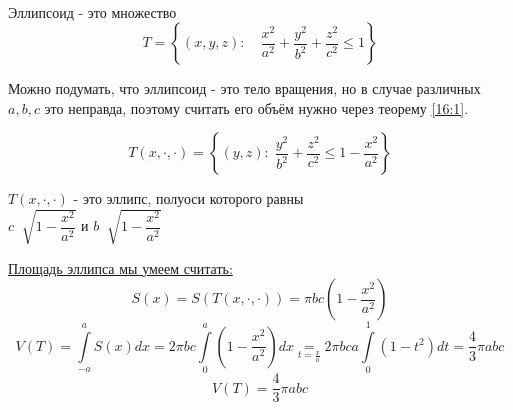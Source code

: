 \documentclass[../main.tex]{subfiles}
\begin{document}
\begin{example}
    
    ~


    Эллипсоид - это множество 
    \[ T=\left\{ \left( x,y,z\right):\quad \dfrac{ x^2}{ a^2}+ \dfrac{ y^2}{ b^2}+ \dfrac{ z^2}{ c^2} \leq 1\right\}\]

    Можно подумать, что эллипсоид - это тело вращения, но в случае различных
    \( a,b,c\) это неправда, поэтому считать его объём нужно через теорему \ref{16:1}. 

    \[ T\left( x,\cdot,\cdot\right)=\left\{ \left( y,z\right):\; \dfrac{ y^2}{ b^2}+ \dfrac{ z^2}{ c^2} \leq 1- \dfrac{ x^2}{ a^2}\right\}\]

    \( T\left( x,\cdot,\cdot\right)\) - это эллипс, полуоси которого равны\\ 
    \( c \;\sqrt[]{1- \dfrac{ x^2}{ a^2}}\) и \( b \;\sqrt[]{1- \dfrac{ x^2}{ a^2}}\)

    \hyperlink{elips_area}{Площадь эллипса мы умеем считать:}
    \[ S\left( x\right)= S\left( T\left( x,\cdot,\cdot\right)\right)= \pi bc\left( 1- \dfrac{ x^2}{ a^2}\right)\]
    \[ V\left( T\right)= \displaystyle\int\limits_{ -a}^{ a} S\left( x\right)dx=2 \pi bc \displaystyle\int\limits_{ 0}^{ a} \left( 1- \dfrac{ x^2}{ a^2}\right)dx \underset{t= \frac{ x}{ a}}{=}2 \pi bca \displaystyle\int\limits_{ 0}^{ 1} \left( 1-t^2\right)dt= \dfrac{ 4}{ 3} \pi abc\]
    \[ V\left( T\right)= \dfrac{ 4}{ 3} \pi abc\]
\end{example}
\end{document}
